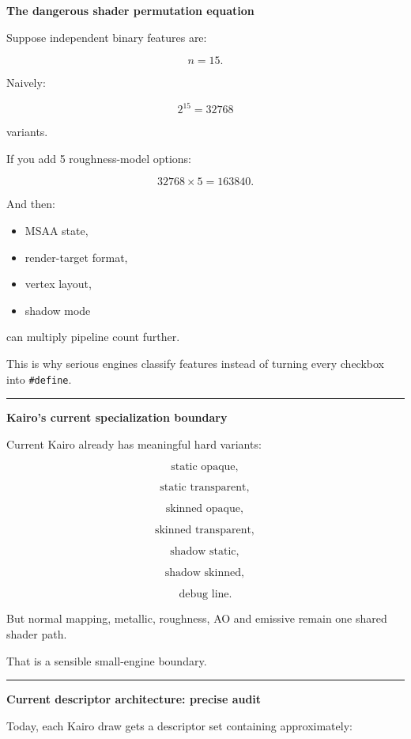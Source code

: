 \textbf{The dangerous shader permutation equation}

Suppose independent binary features are:

\[
n=15.
\]

Naively:

\[
2^{15}
=
32768
\]

variants.

If you add 5 roughness-model options:

\[
32768\times5
=
163840.
\]

And then:

\begin{itemize}
\tightlist
\item
  MSAA state,
\item
  render-target format,
\item
  vertex layout,
\item
  shadow mode
\end{itemize}

can multiply pipeline count further.

This is why serious engines classify features instead of turning every checkbox into \texttt{\#define}.

\begin{center}\rule{0.5\linewidth}{0.5pt}\end{center}

\textbf{Kairo's current specialization boundary}

Current Kairo already has meaningful hard variants:

\[
\text{static opaque},
\]

\[
\text{static transparent},
\]

\[
\text{skinned opaque},
\]

\[
\text{skinned transparent},
\]

\[
\text{shadow static},
\]

\[
\text{shadow skinned},
\]

\[
\text{debug line}.
\]

But normal mapping, metallic, roughness, AO and emissive remain one shared shader path.

That is a sensible small-engine boundary.

\begin{center}\rule{0.5\linewidth}{0.5pt}\end{center}

\textbf{Current descriptor architecture: precise audit}

Today, each Kairo draw gets a descriptor set containing approximately:

